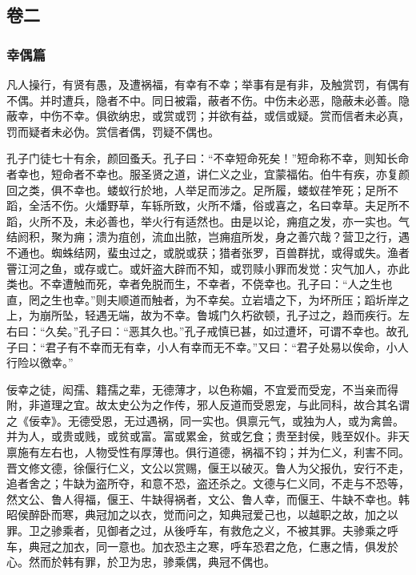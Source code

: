 \documentclass[]{article}
\begin{document}
\hypertarget{header-n52}{%
\subsection{卷二}\label{header-n52}}

\hypertarget{header-n53}{%
\subsubsection{幸偶篇}\label{header-n53}}

凡人操行，有贤有愚，及遭祸福，有幸有不幸；举事有是有非，及触赏罚，有偶有不偶。并时遭兵，隐者不中。同日被霜，蔽者不伤。中伤未必恶，隐蔽未必善。隐蔽幸，中伤不幸。俱欲纳忠，或赏或罚；并欲有益，或信或疑。赏而信者未必真，罚而疑者未必伪。赏信者偶，罚疑不偶也。

孔子门徒七十有余，颜回蚤夭。孔子曰：``不幸短命死矣！''短命称不幸，则知长命者幸也，短命者不幸也。服圣贤之道，讲仁义之业，宜蒙福佑。伯牛有疾，亦复颜回之类，俱不幸也。蝼蚁行於地，人举足而涉之。足所履，蝼蚁荏笮死；足所不蹈，全活不伤。火燔野草，车轹所致，火所不燔，俗或喜之，名曰幸草。夫足所不蹈，火所不及，未必善也，举火行有适然也。由是以论，痈疽之发，亦一实也。气结阏积，聚为痈；溃为疽创，流血出脓，岂痈疽所发，身之善穴哉？营卫之行，遇不通也。蜘蛛结网，蜚虫过之，或脱或获；猎者张罗，百兽群扰，或得或失。渔者罾江河之鱼，或存或亡。或奸盗大辟而不知，或罚赎小罪而发觉：灾气加人，亦此类也。不幸遭触而死，幸者免脱而生，不幸者，不侥幸也。孔子曰：``人之生也直，罔之生也幸。''则夫顺道而触者，为不幸矣。立岩墙之下，为坏所压；蹈圻岸之上，为崩所坠，轻遇无端，故为不幸。鲁城门久朽欲顿，孔子过之，趋而疾行。左右曰：``久矣。''孔子曰：``恶其久也。''孔子戒慎已甚，如过遭坏，可谓不幸也。故孔子曰：``君子有不幸而无有幸，小人有幸而无不幸。''又曰：``君子处易以俟命，小人行险以徼幸。''

佞幸之徒，闳孺、籍孺之辈，无德薄才，以色称媚，不宜爱而受宠，不当亲而得附，非道理之宜。故太史公为之作传，邪人反道而受恩宠，与此同科，故合其名谓之《佞幸》。无德受恩，无过遇祸，同一实也。俱禀元气，或独为人，或为禽兽。并为人，或贵或贱，或贫或富。富或累金，贫或乞食；贵至封侯，贱至奴仆。非天禀施有左右也，人物受性有厚薄也。俱行道德，祸福不钧；并为仁义，利害不同。晋文修文德，徐偃行仁义，文公以赏赐，偃王以破灭。鲁人为父报仇，安行不走，追者舍之；牛缺为盗所夺，和意不恐，盗还杀之。文德与仁义同，不走与不恐等，然文公、鲁人得福，偃王、牛缺得祸者，文公、鲁人幸，而偃王、牛缺不幸也。韩昭侯醉卧而寒，典冠加之以衣，觉而问之，知典冠爱己也，以越职之故，加之以罪。卫之骖乘者，见御者之过，从後呼车，有救危之义，不被其罪。夫骖乘之呼车，典冠之加衣，同一意也。加衣恐主之寒，呼车恐君之危，仁惠之情，俱发於心。然而於韩有罪，於卫为忠，骖乘偶，典冠不偶也。
\end{document}
